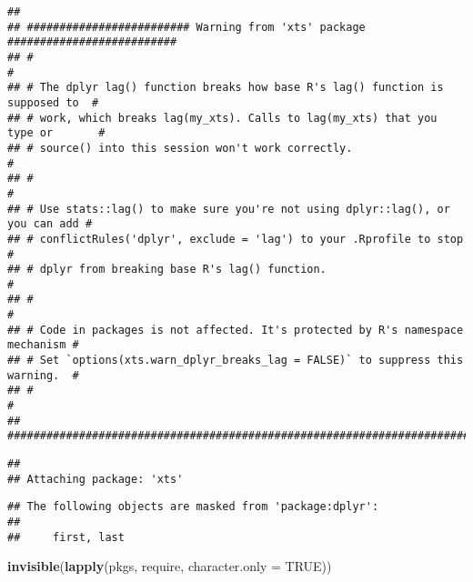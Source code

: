 \documentclass[
]{article}
\newenvironment{Shaded}{\begin{snugshade}}{\end{snugshade}}
\newcommand{\AttributeTok}[1]{\textcolor[rgb]{0.13,0.29,0.53}{#1}}
\newcommand{\ConstantTok}[1]{\textcolor[rgb]{0.56,0.35,0.01}{#1}}
\newcommand{\FunctionTok}[1]{\textcolor[rgb]{0.13,0.29,0.53}{\textbf{#1}}}
\newcommand{\NormalTok}[1]{#1}
\begin{document}
\begin{verbatim}
## 
## ######################### Warning from 'xts' package ##########################
## #                                                                             #
## # The dplyr lag() function breaks how base R's lag() function is supposed to  #
## # work, which breaks lag(my_xts). Calls to lag(my_xts) that you type or       #
## # source() into this session won't work correctly.                            #
## #                                                                             #
## # Use stats::lag() to make sure you're not using dplyr::lag(), or you can add #
## # conflictRules('dplyr', exclude = 'lag') to your .Rprofile to stop           #
## # dplyr from breaking base R's lag() function.                                #
## #                                                                             #
## # Code in packages is not affected. It's protected by R's namespace mechanism #
## # Set `options(xts.warn_dplyr_breaks_lag = FALSE)` to suppress this warning.  #
## #                                                                             #
## ###############################################################################
\end{verbatim}

\begin{verbatim}
## 
## Attaching package: 'xts'
\end{verbatim}

\begin{verbatim}
## The following objects are masked from 'package:dplyr':
## 
##     first, last
\end{verbatim}

\begin{Shaded}
\begin{Highlighting}[]
\FunctionTok{invisible}\NormalTok{(}\FunctionTok{lapply}\NormalTok{(pkgs, require, }\AttributeTok{character.only =} \ConstantTok{TRUE}\NormalTok{))}
\end{Highlighting}
\end{Shaded}
\end{document}
